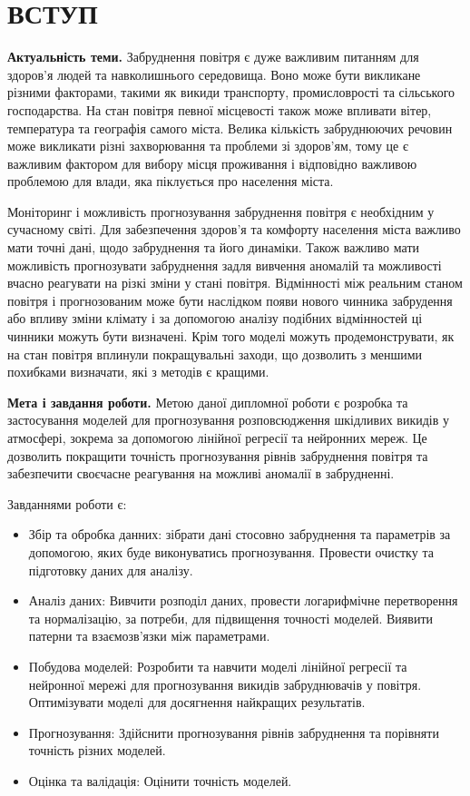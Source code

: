 \chapter*{ВСТУП}

{\bf{Актуальність теми.}}
Забруднення повітря є дуже важливим питанням для здоров'я людей та навколишнього середовища.
Воно може бути викликане різними факторами, такими як викиди транспорту, промисловрості та 
сільського господарства. На стан повітря певної місцевості також може впливати вітер, 
температура та географія самого міста. Велика кількість забруднюючих речовин може викликати 
різні захворювання та проблеми зі здоров'ям, тому це є важливим фактором для вибору місця 
проживання і відповідно важливою проблемою для влади, яка піклується про 
населення міста.


Моніторинг і можливість прогнозування забруднення повітря є необхідним у сучасному світі. 
Для забезпечення здоров'я та комфорту населення міста важливо мати точні дані, щодо забруднення 
та його динаміки. Також важливо мати можливість прогнозувати забруднення задля вивчення 
аномалій та можливості вчасно реагувати на різкі зміни у стані повітря. Відмінності між 
реальним станом повітря і прогнозованим може бути наслідком появи нового чинника забрудення 
або впливу зміни клімату і за допомогою аналізу подібних відмінностей ці чинники можуть 
бути визначені.
Крім того моделі можуть продемонструвати, як на стан повітря вплинули покращувальні заходи,
що дозволить з меншими похибками визначати, які з методів є кращими. 

{\bf{Мета і завдання роботи.}}  
Метою даної дипломної роботи є розробка та застосування моделей для прогнозування розповсюдження шкідливих викидів у атмосфері, зокрема за допомогою лінійної регресії та нейронних мереж. Це дозволить покращити точність прогнозування рівнів забруднення повітря та забезпечити своєчасне реагування на можливі аномалії в забрудненні.

Завданнями роботи є:
\begin{itemize}
    \item Збір та обробка данних: зібрати дані стосовно забруднення та параметрів за допомогою, яких буде виконуватись прогнозування. Провести очистку та підготовку даних для аналізу.
    \item Аналіз даних: Вивчити розподіл даних, провести логарифмічне перетворення та нормалізацію, за потреби, для підвищення точності моделей. Виявити патерни та взаємозв'язки між параметрами.
    \item Побудова моделей: Розробити та навчити моделі лінійної регресії та нейронної мережі для прогнозування викидів забруднювачів у повітря. Оптимізувати моделі для досягнення найкращих результатів.
    \item Прогнозування: Здійснити прогнозування рівнів забруднення та порівняти точність різних моделей.
    \item Оцінка та валідація: Оцінити точність моделей.
\end{itemize}

